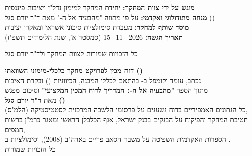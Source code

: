 \documentclass[12pt,a4paper,oneside]{book}
\begin{document}
\begin{titlepage}
\begin{center}
  {\normalsize
  \textbf{מוגש על ידי צוות המחקר:} יחידת המחקר למימון נדל"ן ויציבות פיננסית\\
  \textbf{מנחה מתודולוגי ואקדמי:} על פי מתווה "מהבעיה אל ה-" מאת ד"ר יורם סגל ()\\
  \textbf{מוסד שותף למחקר:} מעבדת סימולציות סיכוני אשראי ומאקרו-יציבות\\[0.35cm]
  \textbf{תאריך הגשה:} \num{15-11-2026} (\texthebrew{סמסטר א', שנת הלימודים תשפ"ז})\\[0.35cm]}

  {\small\color{BrandNavy}
  כל הזכויות שמורות לצוות המחקר ולד"ר יורם סגל \\
  }
\end{center}
\end{titlepage}

\newpage
\vspace*{\fill}
\begin{center}
  \textbf{דוח מכין לפרויקט מחקר כלכלי-מימוני השוואתי ()}\\[0.3cm]
  נכתב, עומד וקומפל ב- בהתאם לכללי המבנה, הכיווניות () ובקרת האיכות\\
  מתוך הספר \textbf{"מהבעיה אל ה-: המדריך לדוח המכין המקצועי"} וסיכום מפגש \\
  מאת \textbf{ד"ר יורם סגל ()}\\[0.4cm]
  כל הנתונים האמפיריים בדוח נשענים על פרסומי הלשכה המרכזית לסטטיסטיקה (הלמ"ס),\\
  חטיבת המחקר והפיקוח על הבנקים בבנק ישראל, אגף הכלכלן הראשי ומאגר כרמ"ן ברשות המסים,\\
  הספרות האקדמית השפיטה על משבר הסאב-פריים בארה"ב (\num{2008}), וסימולציות  ב-.\\[0.4cm]
  כל הזכויות שמורות \\
\end{center}
\vspace*{\fill}

\end{document}
